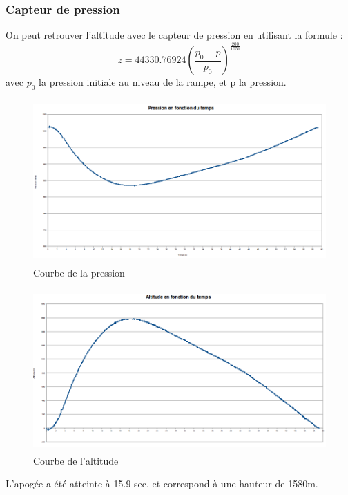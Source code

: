 \documentclass[a4paper,12pt]{scrartcl}
\begin{document}
	  \subsubsection{Capteur de pression}
	  On peut retrouver l'altitude avec le capteur de pression en utilisant la formule : $$ z = 44330.76924(\frac{p_0-p}{p_0})^{\frac{200}{1051}}$$ avec $p_0$ la pression initiale au niveau de la rampe, et p la pression. 
	  \begin{figure}[H]
		\begin{center}
		    \caption{ Courbe de la pression }
		    \includegraphics[height=236px, width=458px]{analyse/pression.png}
		\end{center}
	  \end{figure}
	  \begin{figure}[H]
		\begin{center}
		    \caption{ Courbe de l'altitude }
		    \includegraphics[height=234px, width=449px]{analyse/altitude.png}
		\end{center}
	  \end{figure}
	  L'apogée a été atteinte à 15.9 sec, et correspond à une hauteur de 1580m.
	  
\end{document}
